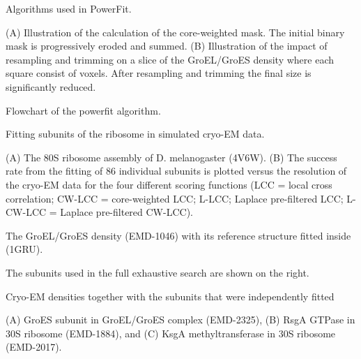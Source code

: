 \caption{Algorithms used in PowerFit.}{(A) Illustration of the calculation of the core-weighted mask. The
initial binary mask is progressively eroded and summed. (B) Illustration of the
impact of resampling and trimming on a slice of the GroEL/GroES density where
each square consist of  voxels. After resampling and trimming the
final size is significantly reduced.}
\stopbuffer


\caption{Flowchart of the powerfit algorithm.}{}
\stopbuffer


\caption{Fitting subunits of the ribosome in simulated cryo-EM data.}
{(A) The 80S ribosome assembly of D. melanogaster (4V6W). (B) The
success rate from the fitting of 86 individual subunits is plotted versus the
resolution of the cryo-EM data for the four different scoring functions (LCC =
local cross correlation; CW-LCC = core-weighted LCC; L-LCC; Laplace
pre-filtered LCC; L-CW-LCC = Laplace pre-filtered CW-LCC).} 
\stopbuffer


\caption{The GroEL/GroES density (EMD-1046) with its reference structure
fitted inside (1GRU).}
{The subunits used in the full exhaustive search are shown
on the right.}
\stopbuffer


\caption{Cryo-EM densities together with the subunits that were independently
fitted}
{(A) GroES subunit in GroEL/GroES complex (EMD-2325), (B) RsgA GTPase in 30S
ribosome (EMD-1884), and (C) KsgA methyltransferase in 30S ribosome
(EMD-2017).}
\stopbuffer

